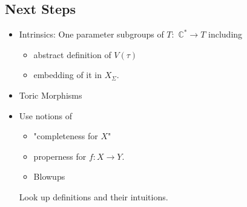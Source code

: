\documentclass[a4paper,12pt]{amsart}
\newcommand{\C}{\ensuremath{\mathbb{C}}}
\begin{document}
\subsection*{Next Steps}
\begin{itemize}
	\item Intrinsics: One parameter subgroups of $T:$ $\C^*\to T$ including 
	 \begin{itemize}
	 	\item abstract definition of $V(\tau)$ 
	 	\item embedding of it in $X_\Sigma.$
	 \end{itemize}
	 \item Toric Morphisms
	 \item Use notions of 
	 \begin{itemize}
	 	\item "completeness for $X$"
	 	\item properness for $f:X\to Y.$
	 	\item Blowups
\end{itemize}	  
Look up definitions and their intuitions. 
\end{itemize}
\end{document}

